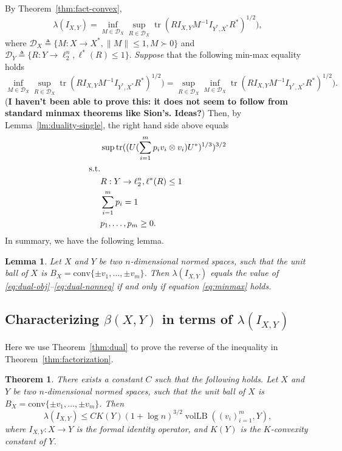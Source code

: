 \documentclass{article}
\newtheorem{theorem}{Theorem}
\newtheorem{lemma}{Lemma}
\newcommand{\eqdef}{\triangleq}
\DeclareMathOperator{\vollb}{volLB}
\DeclareMathOperator{\tr}{tr}
\begin{document}
{By Theorem~\ref{thm:fact-convex}, 
\[
\lambda(I_{X,Y}) = 
\inf_{M \in \mathcal{D}_X} \sup_{R \in \mathcal{D}_X} 
\tr(RI_{X,Y}M^{-1}I_{Y^*,X^*}R^*)^{1/2}),
\]
where $\mathcal{D}_X \eqdef \{M: X \to X^*, \|M\|\le 1, M \succ 0\}$
and $\mathcal{D}_Y \eqdef \{R: Y \to \ell_2^n, \ell^*(R) \le
1\}$. \emph{Suppose} that the following min-max equality holds
\begin{equation}
  \label{eq:minmax}
  \inf_{M \in \mathcal{D}_X} \sup_{R \in \mathcal{D}_X} 
  \tr(RI_{X,Y}M^{-1}I_{Y^*,X^*}R^*)^{1/2})
  = 
  \sup_{R \in \mathcal{D}_X} \inf_{M \in \mathcal{D}_X} 
  \tr(RI_{X,Y}M^{-1}I_{Y^*,X^*}R^*)^{1/2}).
\end{equation}
(\textbf{I haven't been able to prove this: it does not seem to follow
  from standard minmax theorems like Sion's. Ideas?}) Then, by
Lemma~\ref{lm:duality-single}, the right hand side above equals 
\begin{align}
  &\sup \tr((U(\sum_{i = 1}^m{p_i v_i \otimes  v_i})U^*)^{1/3})^{3/2}\label{eq:dual-obj}\\
  \text{s.t.}\notag\\
  &R: Y \to \ell_2^n, \ell^*(R) \le 1 \label{eq:dual-ellstar}\\
  &\sum_{i = 1}^m{p_i} = 1\label{eq:dual-prob}\\
  &p_1, \ldots, p_m \ge 0. \label{eq:dual-nonneg}
\end{align}
In summary, we have the following lemma.

\begin{lemma}
  Let $X$ and $Y$ be two $n$-dimensional normed
  spaces, such that the unit ball of $X$ is $B_X = \mathrm{conv}\{\pm
  v_1, \ldots, \pm v_m\}$. Then $\lambda(I_{X,Y})$ equals
  the value of \eqref{eq:dual-obj}--\eqref{eq:dual-nonneg} if and only
  if equation \eqref{eq:minmax} holds. 
\end{lemma} }%

\subsection{Characterizing $\beta(X,Y)$ in terms of $\lambda(I_{X,Y})$}

Here we use Theorem~\ref{thm:dual} to prove the reverse of the
inequality in Theorem~\ref{thm:factorization}. 

\begin{theorem}\label{thm:fact-vollb}
  There exists a constant $C$ such that the following holds. Let $X$
  and $Y$ be two $n$-dimensional normed spaces, such that the unit
  ball of $X$ is $B_X = \mathrm{conv}\{\pm v_1, \ldots, \pm v_m\}$. Then
  \[
  \lambda(I_{X,Y}) \le C K(Y) (1 + \log n)^{3/2} \vollb((v_i)_{i =
    1}^m, Y),
  \]
  where $I_{X,Y}:X \to Y$ is the formal identity operator, and $K(Y)$
  is the $K$-convexity constant of $Y$. 
\end{theorem}
\end{document}
